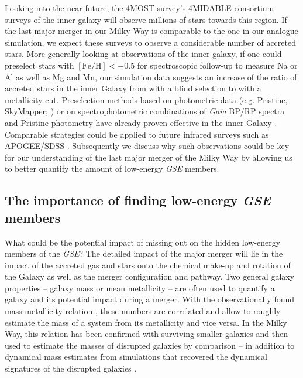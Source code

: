 \documentclass[fleqn,usenatbib]{mnras}
\begin{document}
Looking into the near future, the 4MOST survey's 4MIDABLE consortium surveys of the inner galaxy \citep{4MOST_HR_DiskBulge, 4MOST_LR_DiskBulge} will observe millions of stars towards this region. If the last major merger in our Milky Way is comparable to the one in our analogue simulation, we expect these surveys to observe a considerable number of accreted stars. More generally looking at observations of the inner galaxy, if one could preselect stars with $\mathrm{[Fe/H]} < -0.5$ for spectroscopic follow-up to measure Na or Al as well as Mg and Mn, our simulation data suggests an increase of the ratio of accreted stars in the inner Galaxy from  with a blind selection to  with a metallicity-cut. Preselection methods based on photometric data (e.g. Pristine, SkyMapper; \citealt{Starkenburg2017, DaCosta2019}) or on spectrophotometric combinations of \textit{Gaia} BP/RP spectra and Pristine photometry \citep{Martin2024} have already proven effective in the inner Galaxy \citep[e.g. with the Pristine Inner Galaxy Survey;][]{Arentsen2020, Arentsen2020b}. Comparable strategies could be applied to future infrared surveys such as APOGEE/SDSS \citep{Santana2021}. Subsequently we discuss why such observations could be key for our understanding of the last major merger of the Milky Way by allowing us to better quantify the amount of low-energy \textit{GSE} members.

\subsection{The importance of finding low-energy \textit{GSE} members} \label{sec:discussion_strategy_finding_gse_members}

What could be the potential impact of missing out on the hidden low-energy members of the \textit{GSE}? The detailed impact of the major merger will lie in the impact of the accreted gas and stars onto the chemical make-up and rotation of the Galaxy as well as the merger configuration and pathway. Two general galaxy properties -- galaxy mass or mean metallicity -- are often used to quantify a galaxy and its potential impact during a merger. With the observationally found mass-metallicity relation \citep[for example][]{Gallazzi2005, Kirby2013}, these numbers are correlated and allow to roughly estimate the mass of a system from its metallicity and vice versa. In the Milky Way, this relation has been confirmed with surviving smaller galaxies \citep{Kirby2013} and then used to estimate the masses of disrupted galaxies by comparison \citep[for example][]{Helmi2018} -- in addition to dynamical mass estimates from simulations that recovered the dynamical signatures of the disrupted galaxies \citep[for example][]{Naidu2022b}.
\end{document}
